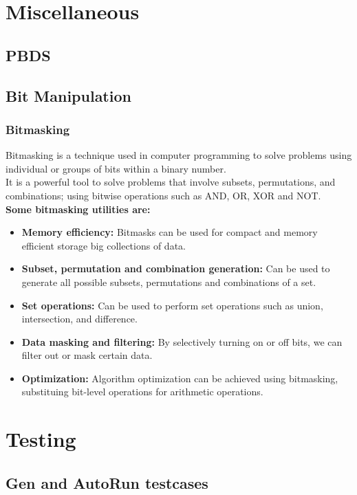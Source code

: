 \section{Miscellaneous}
\subsection{PBDS}
\subsection{Bit Manipulation}
\subsubsection{Bitmasking}
\begin{justify}
Bitmasking is a technique used in computer programming to solve problems using individual or groups of bits within a binary number.\\
It is a powerful tool to solve problems that involve subsets, permutations, and combinations; using bitwise operations such as AND, OR,
XOR and NOT.\\
\textbf{Some bitmasking utilities are:}
\begin{itemize}
\item \textbf{Memory efficiency:} Bitmasks can be used for compact and memory efficient storage big collections of data.
\item \textbf{Subset, permutation and combination generation:} Can be used to generate all possible subsets, permutations and combinations of a set.
\item \textbf{Set operations:} Can be used to perform set operations such as union, intersection, and difference.
\item \textbf{Data masking and filtering:} By selectively turning on or off bits, we can filter out or mask certain data.
\item \textbf{Optimization:} Algorithm optimization can be achieved using bitmasking, substituing bit-level operations for arithmetic operations.
\end{itemize}
\end{justify}

\section{Testing}
\subsection{Gen and AutoRun testcases}

